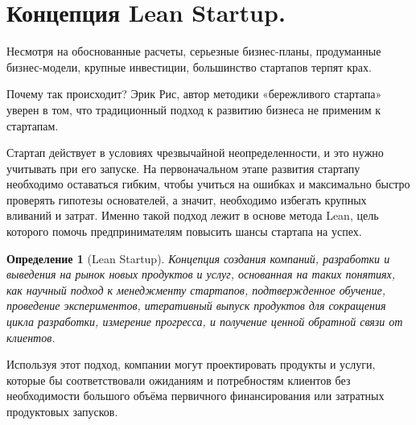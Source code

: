 \documentclass[11pt]{article}
\theoremstyle{plain} %
\newtheorem{proposition}[theorem]{Определение}
\theoremstyle{definition} %
\theoremstyle{remark} %
\begin{document}
\newpage

\section{Концепция Lean Startup.}\label{erste}
Несмотря на обоснованные расчеты, серьезные бизнес-планы, продуманные бизнес-модели, крупные инвестиции, большинство стартапов терпят крах.

\vspace{1em}
Почему так происходит? Эрик Рис, автор методики «бережливого стартапа» уверен в том, что традиционный подход к развитию бизнеса не применим к стартапам.

\vspace{1em}
Стартап действует в условиях чрезвычайной неопределенности, и это нужно учитывать при его запуске. На первоначальном этапе развития стартапу необходимо оставаться гибким, чтобы учиться на ошибках и максимально быстро проверять гипотезы основателей, а значит, необходимо избегать крупных вливаний и затрат. Именно такой подход лежит в основе метода Lean, цель которого помочь предпринимателям повысить шансы стартапа на успех.

\begin{proposition}[Lean Startup]
	Концепция создания компаний, разработки и выведения на рынок новых продуктов и услуг, основанная на таких понятиях, как научный подход к менеджменту стартапов, подтвержденное обучение, проведение экспериментов, итеративный выпуск продуктов для сокращения цикла разработки, измерение прогресса, и получение ценной обратной связи от клиентов.
\end{proposition}

Используя этот подход, компании могут проектировать продукты и услуги, которые бы соответствовали ожиданиям и потребностям клиентов без необходимости большого объёма первичного финансирования или затратных продуктовых запусков.
\end{document}
